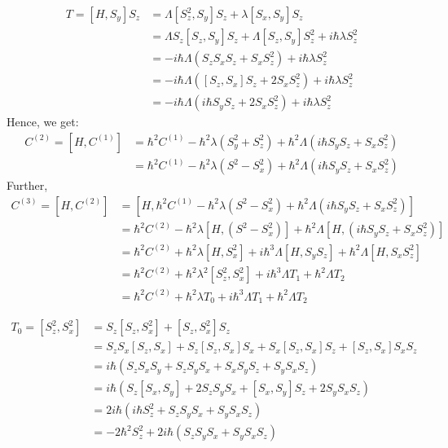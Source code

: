 \documentclass[11pt,a4paper]{article}
\begin{document}
\begin{align*}
T=[ H,   S_y ]S_z &= \Lambda [S_z^2, S_y]S_z + \lambda   [S_x, S_y]S_z   \\
 &=   \Lambda S_z[S_z, S_y]S_z+\Lambda [S_z, S_y]S_z^2 + i \hbar \lambda   S_z^2   \\
  &=  -i \hbar \Lambda  ( S_z S_x S_z+ S_x S_z^2) +  i \hbar \lambda   S_z^2   \\
    &=  -i \hbar \Lambda  ( [S_z, S_x] S_z+ 2 S_x S_z^2) +  i \hbar \lambda   S_z^2   \\
        &=  -i  \hbar \Lambda  ( i \hbar S_y S_z+ 2 S_x S_z^2) +  i \hbar \lambda   S_z^2   
\end{align*}
Hence, we get:
\begin{align*}
C^{(2)}=[H,C^{(1)}]  &= \hbar^2 C^{(1)}  -  \hbar^2 \lambda (S_y^2 +S_z^2)  + \hbar^2 \Lambda  ( i \hbar S_y S_z+  S_x S_z^2) \\
&= \hbar^2 C^{(1)}  -  \hbar^2 \lambda (S^2 - S_x^2)  + \hbar^2 \Lambda  ( i \hbar S_y S_z+  S_x S_z^2)
\end{align*}
Further, 
\begin{align*}
C^{(3)}=[H,C^{(2)}] &= [H,\hbar^2 C^{(1)}  -  \hbar^2 \lambda (S^2 - S_x^2)  + \hbar^2 \Lambda  ( i \hbar S_y S_z+  S_x S_z^2)] \\
&= \hbar^2  C^{(2)}  -  \hbar^2 \lambda [H,(S^2 - S_x^2)]   + \hbar^2 \Lambda  [H,( i \hbar S_y S_z+  S_x S_z^2)] \\
&= \hbar^2  C^{(2)} +  \hbar^2 \lambda [H, S_x^2]   +  i  \hbar^3 \Lambda  [H, S_y S_z] + \hbar^2 \Lambda  [H, S_x S_z^2] \\
&= \hbar^2  C^{(2)} +  \hbar^2 \lambda^2 [S_z^2, S_x^2]   +  i  \hbar^3 \Lambda T_1 + \hbar^2 \Lambda T_2 \\
&= \hbar^2  C^{(2)} +  \hbar^2 \lambda  T_0   +  i  \hbar^3 \Lambda T_1 + \hbar^2 \Lambda T_2 
\end{align*}

\begin{align*}
T_0 =[S_z^2, S_x^2]  &=S_z[S_z, S_x^2] + [S_z, S_x^2]S_z \\
					&=S_z S_x[S_z, S_x] + S_z [S_z, S_x]S_x + S_x[S_z, S_x]S_z + [S_z, S_x]S_xS_z \\
					&=i \hbar(S_z S_xS_y + S_z S_yS_x + S_xS_yS_z + S_y S_xS_z ) \\
					&=i \hbar(S_z [ S_x, S_y] + 2 S_z S_yS_x + [S_x, S_y] S_z + 2S_y S_xS_z ) \\
					&=2i \hbar (i \hbar S_z^2  + S_z S_y S_x   + S_y S_xS_z ) \\
					&=-2 \hbar^2 S_z^2  + 2i \hbar ( S_z S_y S_x   + S_y S_xS_z ) 
\end{align*}
\end{document}
